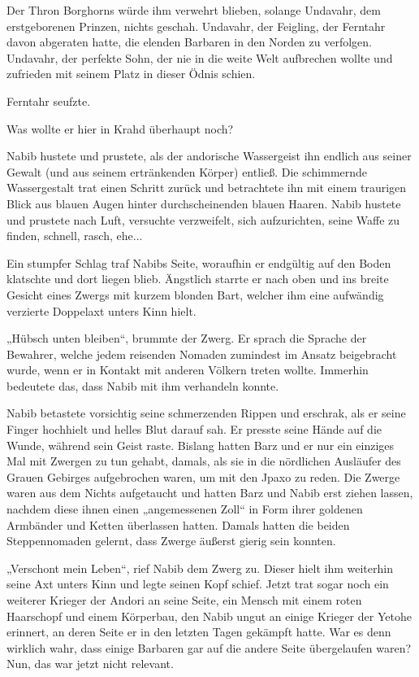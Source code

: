 Der Thron Borghorns würde ihm verwehrt blieben, solange Undavahr, dem erstgeborenen Prinzen, nichts geschah. Undavahr, der Feigling, der Ferntahr davon abgeraten hatte, die elenden Barbaren in den Norden zu verfolgen. Undavahr, der perfekte Sohn, der nie in die weite Welt aufbrechen wollte und zufrieden mit seinem Platz in dieser Ödnis schien.

Ferntahr seufzte.

Was wollte er hier in Krahd überhaupt noch?



\trennzeichen



Nabib hustete und prustete, als der andorische Wassergeist ihn endlich aus seiner Gewalt (und aus seinem ertränkenden Körper) entließ. Die schimmernde Wassergestalt trat einen Schritt zurück und betrachtete ihn mit einem traurigen Blick aus blauen Augen hinter durchscheinenden blauen Haaren. Nabib hustete und prustete nach Luft, versuchte verzweifelt, sich aufzurichten, seine Waffe zu finden, schnell, rasch, ehe...

Ein stumpfer Schlag traf Nabibs Seite, woraufhin er endgültig auf den Boden klatschte und dort liegen blieb. Ängstlich starrte er nach oben und ins breite Gesicht eines Zwergs mit kurzem blonden Bart, welcher ihm eine aufwändig verzierte Doppelaxt unters Kinn hielt.

„Hübsch unten bleiben“, brummte der Zwerg. Er sprach die Sprache der Bewahrer, welche jedem reisenden Nomaden zumindest im Ansatz beigebracht wurde, wenn er in Kontakt mit anderen Völkern treten wollte. Immerhin bedeutete das, dass Nabib mit ihm verhandeln konnte.

Nabib betastete vorsichtig seine schmerzenden Rippen und erschrak, als er seine Finger hochhielt und helles Blut darauf sah. Er presste seine Hände auf die Wunde, während sein Geist raste. Bislang hatten Barz und er nur ein einziges Mal mit Zwergen zu tun gehabt, damals, als sie in die nördlichen Ausläufer des Grauen Gebirges aufgebrochen waren, um mit den Jpaxo zu reden. Die Zwerge waren aus dem Nichts aufgetaucht und hatten Barz und Nabib erst ziehen lassen, nachdem diese ihnen einen „angemessenen Zoll“ in Form ihrer goldenen Armbänder und Ketten überlassen hatten. Damals hatten die beiden Steppennomaden gelernt, dass Zwerge äußerst gierig sein konnten.

„Verschont mein Leben“, rief Nabib dem Zwerg zu. Dieser hielt ihm weiterhin seine Axt unters Kinn und legte seinen Kopf schief. Jetzt trat sogar noch ein weiterer Krieger der Andori an seine Seite, ein Mensch mit einem roten Haarschopf und einem Körperbau, den Nabib ungut an einige Krieger der Yetohe erinnert, an deren Seite er in den letzten Tagen gekämpft hatte. War es denn wirklich wahr, dass einige Barbaren gar auf die andere Seite übergelaufen waren? Nun, das war jetzt nicht relevant.

